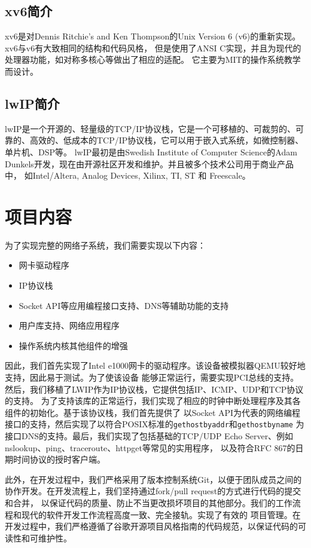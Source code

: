 \documentclass[a4paper,twoside]{ctexrep}
\begin{document}
\begin{spacing}{1.2}
\subsection{xv6简介}

xv6是对Dennis Ritchie's and Ken Thompson的Unix
Version 6 (v6)的重新实现。xv6与v6有大致相同的结构和代码风格，
但是使用了ANSI C实现，并且为现代的处理器功能，如对称多核心等做出了相应的适配。
它主要为MIT的操作系统教学而设计。

\subsection{lwIP简介}

lwIP\cite{dunkels2001design}是一个开源的、轻量级的TCP/IP协议栈，它是一个可移植的、可裁剪的、可靠的、高效的、低成本的TCP/IP协议栈，它可以用于嵌入式系统，如微控制器、单片机、DSP等。
lwIP最初是由Swedish Institute of Computer Science的Adam Dunkels开发，现在由开源社区开发和维护。并且被多个技术公司用于商业产品中，
如Intel/Altera, Analog Devices, Xilinx, TI, ST 和 Freescale。

\section{项目内容}

为了实现完整的网络子系统，我们需要实现以下内容：

\begin{itemize}
	\item 网卡驱动程序
	\item IP协议栈
	\item Socket API等应用编程接口支持、DNS等辅助功能的支持
	\item 用户库支持、网络应用程序
	\item 操作系统内核其他组件的增强
\end{itemize}

因此，我们首先实现了Intel e1000网卡的驱动程序。该设备被模拟器QEMU较好地支持，因此易于测试。为了使该设备
能够正常运行，需要实现PCI总线的支持。然后，我们移植了LWIP作为IP协议栈，它提供包括IP、ICMP、UDP和TCP协议的支持。
为了支持该库的正常运行，我们实现了相应的时钟中断处理程序及其各组件的初始化。基于该协议栈，我们首先提供了
以Socket API为代表的网络编程接口的支持，然后实现了以符合POSIX标准的\texttt{gethostbyaddr}和\texttt{gethostbyname}
为接口DNS的支持。最后，我们实现了包括基础的TCP/UDP Echo Server、例如nslookup、ping、traceroute、httpget等常见的实用程序，
以及符合RFC 867的日期时间协议的授时客户端。

此外，在开发过程中，我们严格采用了版本控制系统Git，以便于团队成员之间的协作开发。在开发流程上，我们坚持通过fork/pull request的方式进行代码的提交和合并，
以保证代码的质量、防止不当更改损坏项目的其他部分。我们的工作流程和现代的软件开发工作流程高度一致、完全接轨。实现了有效的
项目管理。在开发过程中，我们严格遵循了谷歌开源项目风格指南的代码规范，以保证代码的可读性和可维护性。


\end{spacing}
\end{document}

